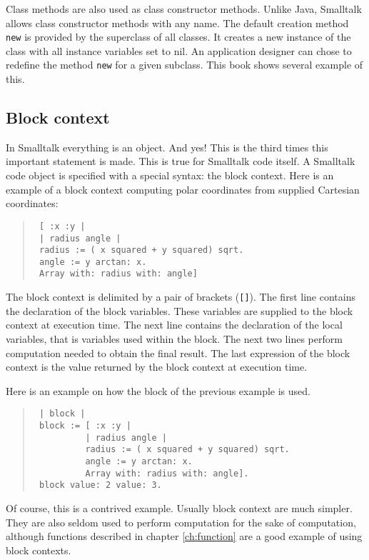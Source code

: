 \documentclass[twoside]{book}
\begin{document}
Class methods are also used as class constructor methods. Unlike
Java, Smalltalk allows class constructor methods with any name.
The default creation method {\tt new} is provided by the
superclass of all classes. It creates a new instance of the class
with all instance variables set to nil. An application designer
can chose to redefine the method {\tt new} for a given subclass.
This book shows several example of this.

\subsection{Block context}
In Smalltalk everything is an object. And yes! This is the third
times this important statement is made. This is true for Smalltalk
code itself. A Smalltalk code object is specified with a special
syntax: the block context. Here is an example of a block context
computing polar coordinates from supplied Cartesian coordinates:
\begin{quote}
\begin{verbatim}
 [ :x :y |
 | radius angle |
 radius := ( x squared + y squared) sqrt.
 angle := y arctan: x.
 Array with: radius with: angle]
\end{verbatim}
\end{quote}
The block context is delimited by a pair of brackets ({\tt []}).
The first line contains the declaration of the block variables.
These variables are supplied to the block context at execution
time. The next line contains the declaration of the local
variables, that is variables used within the block. The next two
lines perform computation needed to obtain the final result. The
last expression of the block context is the value returned by the
block context at execution time.

Here is an example on how the block of the previous example is
used.
\begin{quote}
\begin{verbatim}
 | block |
 block := [ :x :y |
          | radius angle |
          radius := ( x squared + y squared) sqrt.
          angle := y arctan: x.
          Array with: radius with: angle].
 block value: 2 value: 3.
\end{verbatim}
\end{quote}
Of course, this is a contrived example. Usually block context are
much simpler. They are also seldom used to perform computation for
the sake of computation, although functions described in chapter
\ref{ch:function} are a good example of using block contexts.
\end{document}
